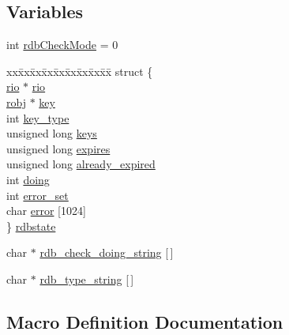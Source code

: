 \subsection*{Variables}
\begin{DoxyCompactItemize}
\item 
int \hyperlink{redis-check-rdb_8c_aefef68276e4a8d9a17eb4850e4e8dc21}{rdb\+Check\+Mode} = 0
\item 
\begin{tabbing}
xx\=xx\=xx\=xx\=xx\=xx\=xx\=xx\=xx\=\kill
struct \{\\
\>\hyperlink{rio_8h_a048ce06d2f559006ef67f885ceb2c1ca}{rio} $\ast$ \hyperlink{redis-check-rdb_8c_a9f62ec81cd12b2b2e4faebe457b15440}{rio}\\
\>\hyperlink{server_8h_a540f174d2685422fbd7d12e3cd44c8e2}{robj} $\ast$ \hyperlink{redis-check-rdb_8c_adc0ee0ed345db513fb6fac27511be4f1}{key}\\
\>int \hyperlink{redis-check-rdb_8c_a2c30e8f426f810c3f53dc75a91e8fc64}{key\_type}\\
\>unsigned long \hyperlink{redis-check-rdb_8c_a1f3b6698ca8496c05e0c9c0d56cb36ac}{keys}\\
\>unsigned long \hyperlink{redis-check-rdb_8c_a014a27f21b0b683e326c20bed7b17e30}{expires}\\
\>unsigned long \hyperlink{redis-check-rdb_8c_a0926b2a2708018af7859da63618edc46}{already\_expired}\\
\>int \hyperlink{redis-check-rdb_8c_a9ecc98b372ff1b8e9eff9f34202f6440}{doing}\\
\>int \hyperlink{redis-check-rdb_8c_afb1bef847cb09dc7930d63514e177c24}{error\_set}\\
\>char \hyperlink{redis-check-rdb_8c_a998302b0b110ee83418a3f0e3ef808d9}{error} \mbox{[}1024\mbox{]}\\
\} \hyperlink{redis-check-rdb_8c_a87cbfd83b26a69e12e621ca97b2155f8}{rdbstate}\\

\end{tabbing}\item 
char $\ast$ \hyperlink{redis-check-rdb_8c_a390c5cddbb415181b1c83215104ec76a}{rdb\+\_\+check\+\_\+doing\+\_\+string} \mbox{[}$\,$\mbox{]}
\item 
char $\ast$ \hyperlink{redis-check-rdb_8c_a000e9bf752f761afff27c2de885a868e}{rdb\+\_\+type\+\_\+string} \mbox{[}$\,$\mbox{]}
\end{DoxyCompactItemize}


\subsection{Macro Definition Documentation}
\mbox{\label{redis-check-rdb_8c_aa43bb9440ce7c820f089f811cb19a790}} 
